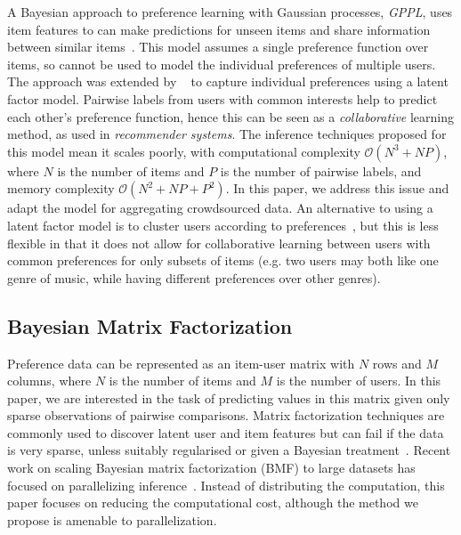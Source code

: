 A Bayesian approach to preference learning with Gaussian processes, \emph{GPPL}, 
uses item features to can make predictions for unseen items and
share information between similar items~\citep{chu2005preference}.
 This model assumes a single preference function over items, so cannot
be used to model the individual preferences of multiple users.
The approach was extended by ~\citet{houlsby2012collaborative}
to capture individual preferences using a latent factor model. 
Pairwise labels from users with common interests help to predict each other's preference function, hence 
this can be seen as a \emph{collaborative} learning method, as used in \emph{recommender systems}.
The inference techniques proposed for this model mean it scales poorly, with computational complexity $\mathcal{O}(N^3 + NP)$, where $N$ is the number of items and $P$ is the number of pairwise labels, and memory complexity $\mathcal{O}(N^2 + NP + P^2)$. In this paper, we address this issue and adapt the model for aggregating crowdsourced data.
An alternative to using a latent factor model is to cluster users according to
preferences~\citep{abbasnejad2013learning}, but this is less flexible in that it does not
allow for collaborative learning between users with common preferences for 
only subsets of items (e.g. two users may both like one genre of music, while having different preferences over other genres). 


\subsection{Bayesian Matrix Factorization}

Preference data can be represented as an item-user matrix with $N$ rows and $M$ columns, 
where $N$ is the number of items and $M$ is the number of users.
In this paper, we are interested in the task of predicting values in this matrix
given only sparse observations of pairwise comparisons.
Matrix factorization techniques are commonly used to discover latent user and item features but 
can fail if the data is very sparse, unless suitably regularised or given 
a Bayesian treatment~\citep{salakhutdinov2008bayesian}. 
Recent work on scaling Bayesian matrix factorization (BMF) to large datasets has focused on parallelizing 
inference~\citep{ahn2015large,vander2017distributed,chen2018large}. Instead of distributing the computation,
this paper focuses on reducing the computational cost, although the method we propose is amenable
to parallelization.

